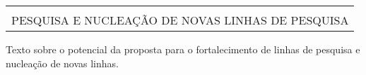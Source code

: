 \begin{longtable}[c]{l}
\hline
\rowcolor[HTML]{C0C0C0} 
\multicolumn{1}{|m{16.6cm}|}{\cellcolor[HTML]{C0C0C0}\textbf{\begin{tabular}[c]{@{}l@{}}
XX. POTENCIAL DA PROPOSTA PARA O FORTALECIMENTO DE LINHAS DE \\
PESQUISA E NUCLEAÇÃO DE NOVAS LINHAS DE PESQUISA
\end{tabular}}} \\ \hline
\endfirsthead
%
\endhead
%
\end{longtable}

Texto sobre o potencial da proposta para o fortalecimento de linhas de pesquisa e nucleação de novas linhas.